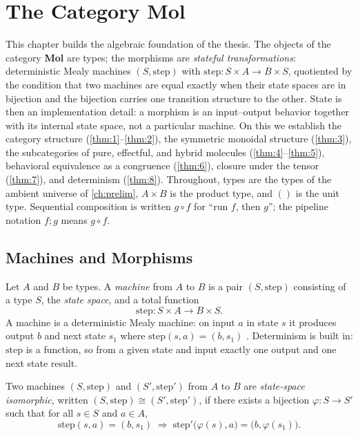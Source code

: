 \chapter{The Category Mol}\label{ch:mol}

This chapter builds the algebraic foundation of the thesis. The objects of the
category \textbf{Mol} are types; the morphisms are \emph{stateful
transformations}: deterministic Mealy machines
$(S, \mathrm{step})$ with $\mathrm{step} : S \times A \to B \times S$,
quotiented by the condition that two machines are equal exactly when their
state spaces are in bijection and the bijection carries one transition
structure to the other. State is then an implementation detail: a morphism is
an input--output behavior together with its internal state space, not a
particular machine. On this we establish the category structure (\autoref{thm:1}--\autoref{thm:2}),
the symmetric monoidal structure (\autoref{thm:3}), the subcategories of pure, effectful,
and hybrid molecules (\autoref{thm:4}--\autoref{thm:5}), behavioral equivalence as a congruence (\autoref{thm:6}),
closure under the tensor (\autoref{thm:7}), and determinism (\autoref{thm:8}). Throughout, types are
the types of the ambient universe of \autoref{ch:prelim}, $A \times B$ is the
product type, and $()$ is the unit type. Sequential composition is written
$g \circ f$ for ``run $f$, then $g$''; the pipeline notation $f ; g$ means
$g \circ f$.

\section{Machines and Morphisms}\label{sec:mol-machines}

\begin{definition}[Machine]\label{def:machine}
Let $A$ and $B$ be types. A \emph{machine} from $A$ to $B$ is a pair
$(S, \mathrm{step})$ consisting of a type $S$, the \emph{state space}, and a
total function
\[ \mathrm{step} : S \times A \to B \times S . \]
A machine is a deterministic Mealy machine: on input $a$ in state $s$ it
produces output $b$ and next state $s_1$ where
$\mathrm{step} (s, a) = (b, s_1)$ \citep{mealy, moore}. Determinism is built
in: $\mathrm{step}$ is a function, so from a given state and input exactly one
output and one next state result.
\end{definition}

\begin{definition}\label{def:stiso}
Two machines $(S, \mathrm{step})$ and $(S', \mathrm{step}')$ from $A$ to $B$
are \emph{state-space isomorphic}, written
$(S, \mathrm{step}) \cong (S', \mathrm{step}')$, if there exists a bijection
$\varphi : S \to S'$ such that for all $s \in S$ and $a \in A$,
\[ \mathrm{step} (s, a) = (b, s_1) \;\Longrightarrow\;
   \mathrm{step}'\bigl (\varphi (s), a\bigr) = \bigl (b, \varphi (s_1)\bigr) . \]
\end{definition}


